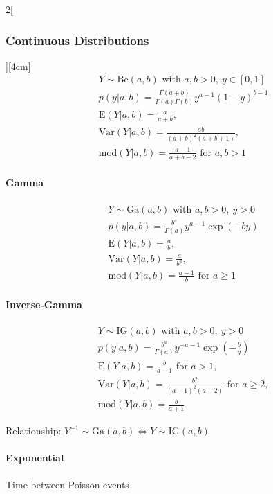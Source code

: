 \documentclass[8pt]{extarticle}
\begin{document}
\begin{multicols}{2}[\subsubsection{Continuous Distributions}][4cm]
    \begin{align*}
    & Y \sim \mathrm{Be}(a, b) \text{ with } a,b > 0,\: y \in \left[0,1\right]\\
    & p(y|a, b) =\frac{\Gamma \left( a+b\right) }{\Gamma (a) \Gamma (b)} y^{a-1} (1-y)^{b-1} \\
    & \mathrm{E}(Y|a, b) = \frac{a}{a+b},\\
    & \mathrm{Var}(Y|a, b) = \frac{ab}{\left(a+b\right)^2(a+b+1)}, \\
    & \mathrm{mod}(Y|a, b) = \frac{a-1}{a+b-2} \text{ for } a,b > 1
  \end{align*}
  
  
  	\paragraph{Gamma}
  
    \begin{align*}
    & Y \sim \mathrm{Ga}(a, b) \text{ with } a,b > 0,\: y > 0\\
    & p(y|a, b) = \frac{ b^a }{\Gamma (a)} y^{a-1} \exp (-by) \\
    & \mathrm{E}(Y|a, b) = \frac{a}{b},\\
    & \mathrm{Var}(Y|a, b) = \frac{a}{b^a}, \\
    & \mathrm{mod}(Y|a, b) = \frac{a-1}{b} \text{ for } a \ge 1
  \end{align*}

  	\paragraph{Inverse-Gamma}
  
    \begin{align*}
    & Y \sim \mathrm{IG}(a, b) \text{ with } a,b > 0,\: y > 0\\
    & p(y|a, b) = \frac{ b^a }{\Gamma (a)} y^{-a-1} \exp (-\frac{b}{y}) \\
    & \mathrm{E}(Y|a, b) = \frac{b}{a-1} \text{ for } a > 1,\\
    & \mathrm{Var}(Y|a, b) = \frac{b^2}{(a-1)^2(a-2)} \text{ for } a \ge 2, \\
    & \mathrm{mod}(Y|a, b) = \frac{b}{a+1}
  \end{align*}
  
\noindent Relationship: $Y^{-1} \sim \mathrm{Ga}(a, b) \Leftrightarrow Y \sim \mathrm{IG}(a, b)$
  
  
  	\paragraph{Exponential} Time between Poisson events
  

\end{multicols}
\end{document}
